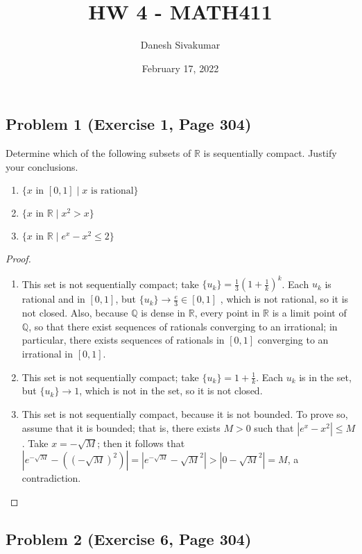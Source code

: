 \documentclass{article}
\title{HW 4 - MATH411}
\author{Danesh Sivakumar}
\date{February 17, 2022}
\begin{document}
\maketitle 


\subsection*{Problem 1 (Exercise 1, Page 304)}

Determine which of the following subsets of $\mathbb{R}$ is sequentially compact. Justify your conclusions. 
\begin{enumerate}[label = \alph*)]
\item $\{x \text{ in } [0, 1] \mid x \text{ is rational} \}$
\item $\{x \text{ in } \mathbb{R} \mid x^2 > x \}$
\item $\{x \text{ in } \mathbb{R} \mid e^x-x^2 \leq 2 \}$
\end{enumerate}

\begin{proof} \quad \\
\begin{enumerate}[label = \alph*)]
\item This set is not sequentially compact; take $\{u_k\} = \frac{1}{3}(1+\frac{1}{k})^k$. Each $u_k$ is rational and in $[0, 1]$, but $\{u_k\} \to \frac{e}{3} \in [0, 1]$ , which is not rational, so it is not closed. Also, because $\mathbb{Q}$ is dense in $\mathbb{R}$, every point in $\mathbb{R}$ is a limit point of $\mathbb{Q}$, so that there exist sequences of rationals converging to an irrational; in particular, there exists sequences of rationals in $[0, 1]$ converging to an irrational in $[0, 1]$.
\item This set is not sequentially compact; take $\{u_k\} = 1+\frac{1}{k}$. Each $u_k$ is in the set, but $\{u_k\} \to 1$, which is not in the set, so it is not closed.
\item This set is not sequentially compact, because it is not bounded. To prove so, assume that it is bounded; that is, there exists $M > 0$ such that $|e^x - x^2| \leq M$. Take $x = -\sqrt{M}$; then it follows that $|e^{-\sqrt{M}} - ((-\sqrt{M})^2)| = |e^{-\sqrt{M}} - \sqrt{M}^2| > |0 - \sqrt{M}^2| = M$, a contradiction.     
\end{enumerate}
\end{proof}


\subsection*{Problem 2 (Exercise 6, Page 304)}
\end{document}
